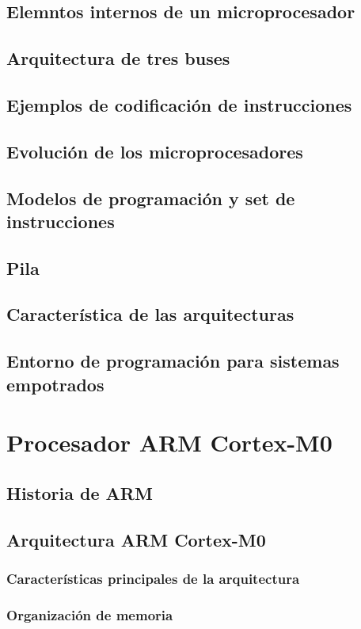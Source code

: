\documentclass[a4paper]{book}
\numberwithin{figure}{chapter}
\numberwithin{equation}{chapter}
\begin{document}
\section{Elemntos internos de un microprocesador}
\section{Arquitectura de tres buses}
\section{Ejemplos de codificación de instrucciones}
\section{Evolución de los microprocesadores}
\section{Modelos de programación y set de instrucciones}
\section{Pila}
\section{Característica de las arquitecturas}
\section{Entorno de programación para sistemas empotrados}

\chapter{Procesador ARM Cortex-M0}
\section{Historia de ARM}
\section{Arquitectura ARM Cortex-M0}
\subsection{Características principales de la arquitectura}
\subsection{Organización de memoria}
\end{document}
